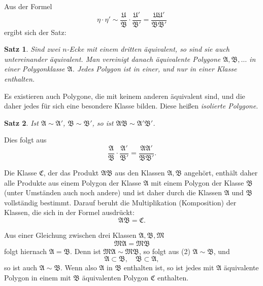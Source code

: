 \documentclass[12pt,a4paper]{article}
\newtheorem*{satz}{Satz}
\begin{document}
Aus der Formel
\[
\eta \cdot \eta' \sim \frac{\mathfrak{U}}{\mathfrak{B}} \cdot \frac{\mathfrak{U}'}{\mathfrak{B}'} = \frac{\mathfrak{U}\mathfrak{U}'}{\mathfrak{B}\mathfrak{B}'}
\]
ergibt sich der Satz:

\begin{satz}
Sind zwei $n$-Ecke mit einem dritten äquivalent, so sind sie auch untereinander äquivalent. Man vereinigt danach äquivalente Polygone $\mathfrak{A}, \mathfrak{B}, \ldots$ in einer \emph{Polygonklasse} $\mathfrak{A}$. Jedes Polygon ist in einer, und nur in einer Klasse enthalten.
\end{satz}

Es existieren auch Polygone, die mit keinem anderen äquivalent sind, und die daher jedes für sich eine besondere Klasse bilden. Diese heißen \emph{isolierte Polygone}.

\begin{satz}
Ist $\mathfrak{A} \sim \mathfrak{A}'$, $\mathfrak{B} \sim \mathfrak{B}'$, so ist $\mathfrak{A}\mathfrak{B} \sim \mathfrak{A}'\mathfrak{B}'$.
\end{satz}

Dies folgt aus
\begin{equation}\label{eq:191-4}
\frac{\mathfrak{A}}{\mathfrak{B}} \cdot \frac{\mathfrak{A}'}{\mathfrak{B}'} = \frac{\mathfrak{A}\mathfrak{A}'}{\mathfrak{B}\mathfrak{B}'}.
\end{equation}

Die Klasse $\mathfrak{C}$, der das Produkt $\mathfrak{A}\mathfrak{B}$ aus den Klassen $\mathfrak{A}, \mathfrak{B}$ angehört, enthält daher alle Produkte aus einem Polygon der Klasse $\mathfrak{A}$ mit einem Polygon der Klasse $\mathfrak{B}$ (unter Umständen auch noch andere) und ist daher durch die Klassen $\mathfrak{A}$ und $\mathfrak{B}$ vollständig bestimmt. Darauf beruht die Multiplikation (Komposition) der Klassen, die sich in der Formel ausdrückt:
\begin{equation}\label{eq:191-5}
\mathfrak{A}\mathfrak{B} = \mathfrak{C}.
\end{equation}

Aus einer Gleichung zwischen drei Klassen $\mathfrak{A}, \mathfrak{B}, \mathfrak{M}$
\[
\mathfrak{M}\mathfrak{A} = \mathfrak{M}\mathfrak{B}
\]
folgt hiernach $\mathfrak{A} = \mathfrak{B}$. Denn ist $\mathfrak{M}\mathfrak{A} \sim \mathfrak{M}\mathfrak{B}$, so folgt aus (2) $\mathfrak{A} \sim \mathfrak{B}$, und
\[
\mathfrak{A} \subset \mathfrak{B}, \quad \mathfrak{B} \subset \mathfrak{A},
\]
so ist auch $\mathfrak{A} \sim \mathfrak{B}$. Wenn also $\mathfrak{A}$ in $\mathfrak{B}$ enthalten ist, so ist jedes mit $\mathfrak{A}$ äquivalente Polygon in einem mit $\mathfrak{B}$ äquivalenten Polygon $\mathfrak{C}$ enthalten.
\end{document}
